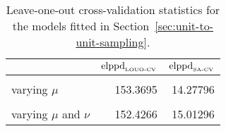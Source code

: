 \begin{table}
\centering
\caption{\label{tab:elppd_loo}Leave-one-out cross-validation statistics for the models fitted in Section~\ref{sec:unit-to-unit-sampling}.}
\centering
\begin{tabular}[t]{lrr}
\toprule
  & $\hbox{elppd}_{\hbox{\tiny{LOUO-CV}}}$ & $\hbox{elppd}_{\hbox{\tiny{SA-CV}}}$\\
\midrule
\cellcolor{gray!10}{complete pooling} & \cellcolor{gray!10}{154.3269} & \cellcolor{gray!10}{15.09467}\\
varying $\mu$ & 153.3695 & 14.27796\\
\cellcolor{gray!10}{varying $\nu$} & \cellcolor{gray!10}{154.6142} & \cellcolor{gray!10}{15.08497}\\
varying $\mu$ and $\nu$ & 152.4266 & 15.01296\\
\bottomrule
\end{tabular}
\end{table}
